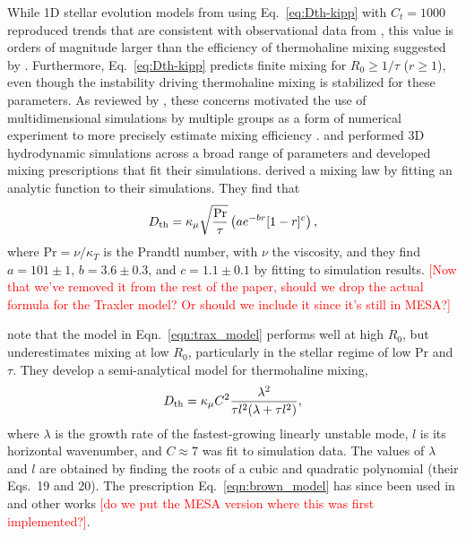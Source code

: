 While 1D stellar evolution models from \citet{charbonnel_thermohaline_2007} using Eq.~\eqref{eq:Dth-kipp} with $C_t = 1000$ reproduced trends that are consistent with observational data from \citet{Gratton2000}, this value is orders of magnitude larger than the efficiency of thermohaline mixing suggested by \citet{kippenhahn_etal_1980}. 
Furthermore, Eq.~\eqref{eq:Dth-kipp} predicts finite mixing for $R_0 \geq 1/\tau$ ($r \geq 1$), even though the instability driving thermohaline mixing is stabilized for these parameters. 
As reviewed by \citet{garaud_DDC_review_2018}, these concerns motivated the use of multidimensional simulations by multiple groups as a form of numerical experiment to more precisely estimate mixing efficiency \citep{Denissenkov2010thermohaline,traxler_etal_2011}. 
\citet{traxler_etal_2011} and \citet{brown_etal_2013} performed 3D hydrodynamic simulations across a broad range of parameters and developed mixing prescriptions that fit their simulations. 
\citet{traxler_etal_2011} derived a mixing law by fitting an analytic function to their simulations.
They find that
\begin{equation} \label{eqn:trax_model}
   \Dth = \kappa_{\mu}\sqrt{\frac{\mathrm{Pr}}{\tau}}\left(a e^{-br}[1 - r]^c\right),
\end{equation}
where $\mathrm{Pr} = \nu / \kappa_T$ is the Prandtl number, with $\nu$ the viscosity, and they find $a = 101 \pm 1$, $b = 3.6 \pm 0.3$, and $c = 1.1 \pm 0.1$ by fitting to simulation results. \textcolor{red}{[Now that we've removed it from the rest of the paper, should we drop the actual formula for the Traxler model? Or should we include it since it's still in MESA?]}

\citet{brown_etal_2013} note that the model in Eqn.~\eqref{eqn:trax_model} performs well at high $R_0$, but underestimates mixing at low $R_0$, particularly in the stellar regime of low Pr and $\tau$.
They develop a semi-analytical model for thermohaline mixing,
\begin{equation}
    \Dth = \kappa_{\mu}C^2\frac{\lambda^2}{\tau l^2(\lambda + \tau l^2)},
    \label{eqn:brown_model}
\end{equation}
where $\lambda$ is the growth rate of the fastest-growing linearly unstable mode, $l$ is its horizontal wavenumber, and $C \approx 7$ was fit to simulation data.
The values of $\lambda$ and $l$ are obtained by finding the roots of a cubic and quadratic polynomial (their Eqs.~19 and 20).
The prescription Eq.~\eqref{eqn:brown_model} has since been used in \citep{bauer_bildsten_2019} and other works \textcolor{red}{[do we put the MESA version where this was first implemented?]}.

